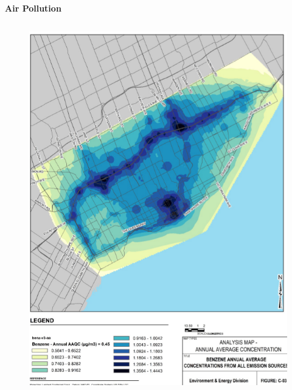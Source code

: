 \documentclass[aspectratio=169]{beamer}
\begin{document}






\begin{frame}
	
	\textbf{Air Pollution}
	
	\begin{columns}
		\begin{column}{0.5\textwidth}
			
			
			\begin{figure}
				\centering
				\includegraphics[width=0.8\linewidth]{images/tor_benzene.png}
			\end{figure}
		\end{column}
		

\end{columns}
\end{frame}
\end{document}
